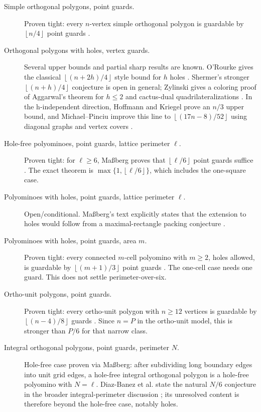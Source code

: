 \documentclass[11pt]{article}
\newcommand{\floor}[1]{\left\lfloor #1 \right\rfloor}
\newcommand{\loversix}{\floor{\ell/6}}
\begin{document}
\begin{description}
  \item[Simple orthogonal polygons, point guards.]
  Proven tight: every $n$-vertex simple orthogonal polygon is guardable by
  $\floor{n/4}$ point guards \cite{KahnKlaweKleitman1983,Gyori1986}.

  \item[Orthogonal polygons with holes, vertex guards.]
  Several upper bounds and partial sharp results are known.  O'Rourke gives
  the classical $\floor{(n+2h)/4}$ style bound for $h$ holes
  \cite{ORourke1987}.  Shermer's stronger $\floor{(n+h)/4}$ conjecture is
  open in general; Zylinski gives a coloring proof of Aggarwal's theorem for
  $h \leq 2$ and cactus-dual quadrilateralizations
  \cite{UrrutiaOpenProblems,Zylinski2006}.  In the h-independent direction,
  Hoffmann and Kriegel prove an $n/3$ upper bound, and Michael--Pinciu improve
  this line to $\floor{(17n-8)/52}$ using diagonal graphs and vertex covers
  \cite{HoffmannKriegel1996,MichaelPinciu2016}.

  \item[Hole-free polyominoes, point guards, lattice perimeter $\ell$.]
  Proven tight: for $\ell \geq 6$, Ma{\ss}berg proves that $\loversix$ point
  guards suffice \cite[Theorem~1]{Massberg2014}.  The exact theorem is
  $\max\{1,\loversix\}$, which includes the one-square case.

  \item[Polyominoes with holes, point guards, lattice perimeter $\ell$.]
  Open/conditional.  Ma{\ss}berg's text explicitly states that the extension
  to holes would follow from a maximal-rectangle packing conjecture
  \cite[Lem.~6.9 and Conj.~6.10]{MassbergHabilitation}.

  \item[Polyominoes with holes, point guards, area $m$.]
  Proven tight: every connected $m$-cell polyomino with $m\geq 2$, holes
  allowed, is guardable by $\floor{(m+1)/3}$ point guards
  \cite[Cor.~1]{BiedlEtAl2012}.  The one-cell case needs one guard.  This
  does not settle perimeter-over-six.

  \item[Ortho-unit polygons, point guards.]
  Proven tight: every ortho-unit polygon with $n \geq 12$ vertices is guardable
  by $\floor{(n-4)/8}$ guards \cite{DiazBanezEtAl2025}.  Since $n=P$ in the
  ortho-unit model, this is stronger than $P/6$ for that narrow class.

  \item[Integral orthogonal polygons, point guards, perimeter $N$.]
  Hole-free case proven via Ma{\ss}berg: after subdividing long boundary edges
  into unit grid edges, a hole-free integral orthogonal polygon is a hole-free
  polyomino with $N=\ell$.  Diaz-Banez et al. state the natural $N/6$
  conjecture in the broader integral-perimeter discussion
  \cite{DiazBanezEtAl2025}; its unresolved content is therefore beyond the
  hole-free case, notably holes.


\end{description}
\end{document}
